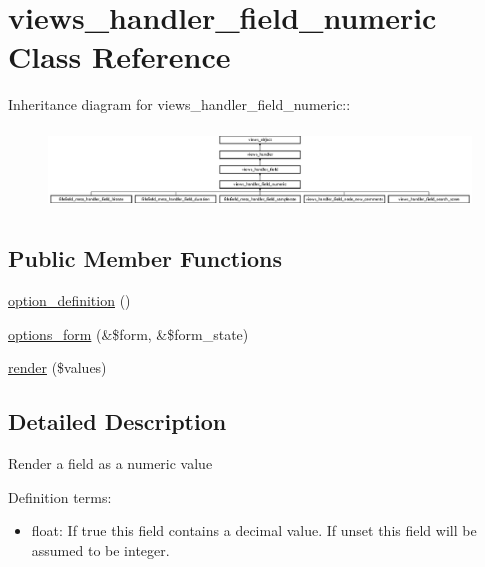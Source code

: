 \hypertarget{classviews__handler__field__numeric}{
\section{views\_\-handler\_\-field\_\-numeric Class Reference}
\label{classviews__handler__field__numeric}
}
Inheritance diagram for views\_\-handler\_\-field\_\-numeric::\begin{figure}[H]
\begin{center}
\leavevmode
\includegraphics[height=2.15385cm]{classviews__handler__field__numeric}
\end{center}
\end{figure}
\subsection*{Public Member Functions}
\begin{CompactItemize}
\item 
\hyperlink{classviews__handler__field__numeric_ab74a55c8b3c564ee995e210a503947b}{option\_\-definition} ()
\item 
\hyperlink{classviews__handler__field__numeric_e6f81d1896ece64e9450ebc2d60da2fd}{options\_\-form} (\&\$form, \&\$form\_\-state)
\item 
\hyperlink{classviews__handler__field__numeric_9c76aeef951c45385fd91a22e5e656aa}{render} (\$values)
\end{CompactItemize}


\subsection{Detailed Description}
Render a field as a numeric value

Definition terms:\begin{itemize}
\item float: If true this field contains a decimal value. If unset this field will be assumed to be integer. \end{itemize}


